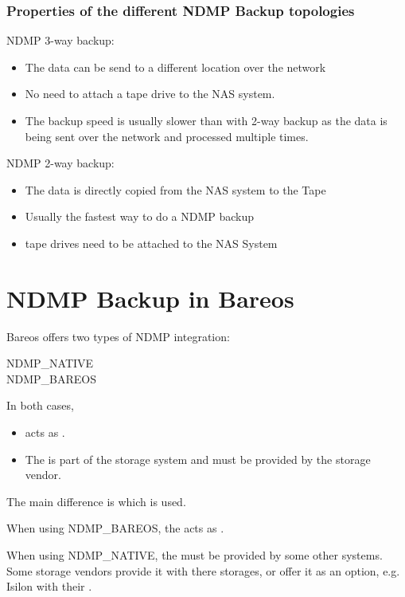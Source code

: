 \subsubsection{Properties of the different NDMP Backup topologies}


NDMP 3-way backup:
\begin{itemize}
  \item  The data can be send to a different location over the network
  \item  No need to attach a tape drive to the NAS system.
  \item The backup speed is usually slower than with 2-way backup as the data is being sent over the network and processed multiple times.
\end{itemize}



NDMP 2-way backup:
\begin{itemize}
  \item The data is directly copied from the NAS system to the Tape
  \item Usually the fastest way to do a NDMP backup
  \item tape drives need to be attached to the NAS System
\end{itemize}



\section{NDMP Backup in Bareos}

Bareos offers two types of NDMP integration:

\begin{description}
    \item[NDMP\_NATIVE]
    \item[NDMP\_BAREOS]
\end{description}

In both cases,
\begin{itemize}
    \item \bareosDir acts as \DataManagementAgent.
    \item The \DataAgent is part of the storage system
and must be provided by the storage vendor.
\end{itemize}

The main difference is which \TapeAgent is used.

When using NDMP\_BAREOS, the \bareosSd acts as \TapeAgent.

When using NDMP\_NATIVE, the \TapeAgent must be provided by some other systems.
Some storage vendors provide it with there storages, or offer it as an option,
e.g. Isilon with their .


